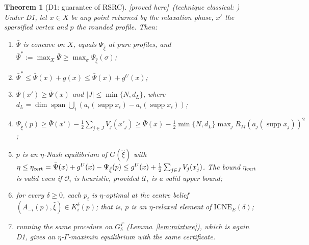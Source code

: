 \documentclass[11pt]{article}
\newtheorem{theorem}{Theorem}[section]
\theoremstyle{definition}
\theoremstyle{remark}
\newcommand{\spn}{\operatorname{span}}
\newcommand{\supp}{\operatorname{supp}}
\newcommand{\ICNE}{\mathrm{ICNE}}
\newcommand{\PROVED}{\textsf{[proved here]}}
\begin{document}
\begin{theorem}[D1: guarantee of RSRC]\label{thm:D1} \PROVED\ (technique classical: \cite{AE76,UB16,BLOPW23})
Under D1, let $x\in X$ be any point returned by the relaxation phase, $x'$ the sparsified vertex and $p$ the rounded profile. Then:
\begin{enumerate}[label=(\alph*)]
\item $\bar\Psi$ is concave on $X$, equals $\Psi_{\hat\xi}$ at pure profiles, and $\bar\Psi^*:=\max_X\bar\Psi\ge\max_\sigma\Psi_{\hat\xi}(\sigma)$;
\item $\bar\Psi^*\le\bar\Psi(x)+g(x)\le\bar\Psi(x)+g^U(x)$;
\item $\bar\Psi(x')\ge\bar\Psi(x)$ and $|J|\le\min\{N,d_L\}$, where $d_L=\dim\spn\bigcup_i(a_i(\supp x_i)-a_i(\supp x_i))$;
\item $\Psi_{\hat\xi}(p)\ge\bar\Psi(x')-\tfrac12\sum_{j\in J}V_j(x'_j)\ge\bar\Psi(x)-\tfrac12\min\{N,d_L\}\max_jR_M(a_j(\supp x_j))^2$;
\item $p$ is an $\eta$-Nash equilibrium of $G(\hat\xi)$ with $\eta\le\eta_{\rm cert}=\bar\Psi(x)+g^U(x)-\Psi_{\hat\xi}(p)\le g^U(x)+\tfrac12\sum_{j\in J}V_j(x'_j)$. The bound $\eta_{\rm cert}$ is valid even if $\mathcal O_i$ is heuristic, provided $\mathcal U_i$ is a valid upper bound;
\item for every $\delta\ge0$, each $p_i$ is $\eta$-optimal at the centre belief $(A_{-i}(p),\hat\xi)\in K_i^\delta(p)$; that is, $p$ is an $\eta$-relaxed element of $\ICNE_E(\delta)$;
\item running the same procedure on $G^\Gamma_\delta$ (Lemma~\ref{lem:mixture}), which is again D1, gives an $\eta$-$\Gamma$-maximin equilibrium with the same certificate.
\end{enumerate}
\end{theorem}
\end{document}

